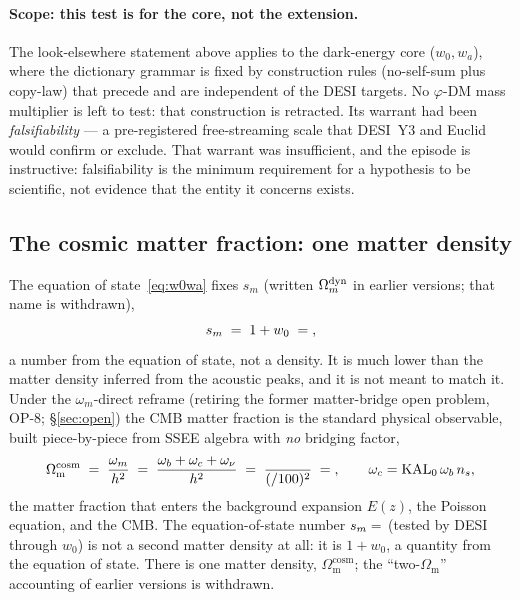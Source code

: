 \documentclass[a4paper,11pt]{article}
\newcommand{\Om}{\Omega_{\mathrm{m}}}
\begin{document}
\paragraph{Scope: this test is for the core, not the extension.} The
look-elsewhere statement above applies to the dark-energy core ($w_0,w_a$),
where the dictionary grammar is fixed by construction rules (no-self-sum plus
copy-law) that precede and are independent of the DESI targets. No
$\varphi$-DM mass multiplier is left to test: that construction is retracted. Its
warrant had been \emph{falsifiability} --- a pre-registered free-streaming
scale that DESI~Y3 and Euclid would confirm or exclude. That warrant was
insufficient, and the episode is instructive: falsifiability is the minimum
requirement for a hypothesis to be scientific, not evidence that the entity it
concerns exists.

\subsection{The cosmic matter fraction: one matter density}
\label{sec:two-omega}
The equation of state~\eqref{eq:w0wa} fixes $s_m$ (written
$\Omega_m^{\rm dyn}$ in earlier versions; that name is withdrawn),
\begin{equation}
  s_m \;=\; 1+w_0 \;=\; \val{S_M_d6} ,
  \label{eq:omdyn}
\end{equation}
a number from the equation of state, not a density. It is much lower than
the matter density inferred from the acoustic peaks, and it is not meant to match it. Under
the $\omega_m$-direct reframe (retiring the former matter-bridge open problem,
OP-8; \S\ref{sec:open}) the CMB matter fraction is the
standard physical observable, built piece-by-piece from SSEE algebra with
\emph{no} bridging factor,
\begin{equation}
  \Om^{\mathrm{cosm}} \;=\; \frac{\omega_m}{h^2}
        \;=\; \frac{\omega_b+\omega_c+\omega_\nu}{h^2}
        \;=\; \frac{\val{OMEGA_M_H2_d5}}{(\val{H0_GLOBAL_d5}/100)^2} \;=\; \val{OMEGA_M_TOTAL_d6} ,
  \qquad \omega_c=\mathrm{KAL_0}\,\omega_b\,n_s ,
  \label{eq:omcosm}
\end{equation}
the matter fraction that enters the background expansion $E(z)$, the Poisson
equation, and the CMB. The equation-of-state number $s_m=\val{S_M_d6}$ (tested by DESI through $w_0$)
is not a second matter density at all: it is $1+w_0$, a quantity from the
equation of state. There is one matter density, $\Om^{\mathrm{cosm}}$; the
``two-$\Om$'' accounting of earlier versions is withdrawn.
\end{document}
